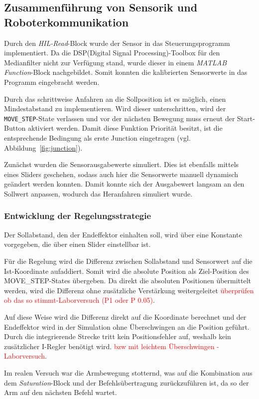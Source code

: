 \subsection{Zusammenführung von Sensorik und Roboterkommunikation}

Durch den \textit{HIL-Read}-Block wurde der Sensor in das Steuerungsprogramm implementiert. Da die DSP(Digital Signal Processing)-Toolbox für den Medianfilter nicht zur Verfügung stand, wurde dieser in einem \textit{MATLAB Function}-Block nachgebildet. Somit konnten die kalibrierten Sensorwerte in das Programm eingebracht werden.

Durch das schrittweise Anfahren an die Sollposition ist es möglich, einen Mindestabstand zu implementieren. Wird dieser unterschritten, wird der \texttt{MOVE\_STEP}-State verlassen und vor der nächsten Bewegung muss erneut der Start-Button aktiviert werden. Damit diese Funktion Priorität besitzt, ist die entsprechende Bedingung als erste Junction eingetragen (vgl. Abbildung~\ref{fig:junction}).

Zunächst wurden die Sensorausgabewerte simuliert. Dies ist ebenfalls mittels eines Sliders geschehen, sodass auch hier die Sensorwerte manuell dynamisch geändert werden konnten. Damit konnte sich der Ausgabewert langsam an den Sollwert anpassen, wodurch das Heranfahren simuliert wurde.


\subsubsection{Entwicklung der Regelungsstrategie}
Der Sollabstand, den der Endeffektor einhalten soll, wird über eine Konstante vorgegeben, die über einen Slider einstellbar ist. 

Für die Regelung wird die Differenz zwischen Sollabstand und Sensorwert auf die Ist-Koordinate aufaddiert. Somit wird die absolute Position als Ziel-Position des MOVE\_STEP-States übergeben. Da direkt die absoluten Positionen übermittelt werden, wird die Differenz ohne zusätzliche Verstärkung weitergeleitet \textcolor{red}{überprüfen ob das so stimmt-Laborversuch (P1 oder P 0.05)}.

Auf diese Weise wird die Differenz direkt auf die Koordinate berechnet und der Endeffektor wird in der Simulation ohne Überschwingen an die Position geführt. Durch die integrierende Strecke tritt kein Positionsfehler auf, weshalb kein zusätzlicher I-Regler benötigt wird. \textcolor{red}{bzw mit leichtem Überschwingen - Laborversuch}. 


Im realen Versuch war die Armbewegung stotternd, was auf die Kombination aus dem \textit{Saturation}-Block und der Befehlsübertragung zurückzuführen ist, da so der Arm auf den nächsten Befehl wartet. 

